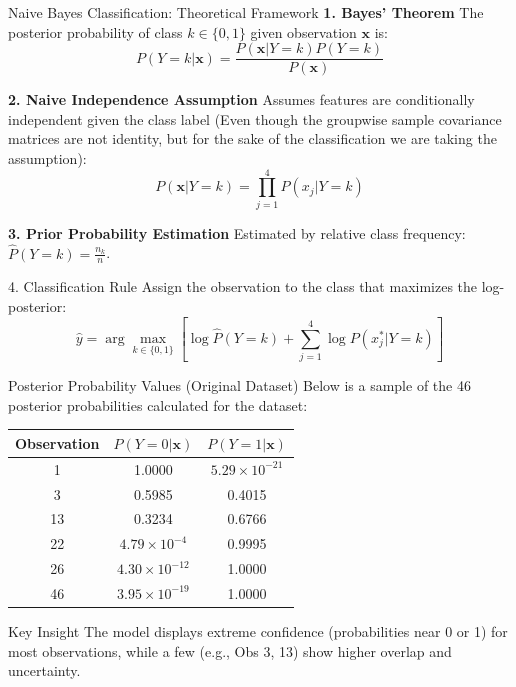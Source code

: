 \documentclass[8pt, aspectratio=169]{beamer}
\begin{document}
\begin{frame}{Naive Bayes Classification: Theoretical Framework}
    \textbf{1. Bayes' Theorem}
    The posterior probability of class $k \in \{0, 1\}$ given observation $\mathbf{x}$ is:
    \[ P(Y = k | \mathbf{x}) = \frac{P(\mathbf{x} | Y = k) P(Y = k)}{P(\mathbf{x})} \]
    
    \textbf{2. Naive Independence Assumption}
    Assumes features are conditionally independent given the class label (Even though the groupwise sample covariance matrices are not identity, but for the sake of the classification we are taking the assumption):
    \[ P(\mathbf{x} | Y = k) = \prod_{j=1}^{4} P(x_j | Y = k) \]
    
    \textbf{3. Prior Probability Estimation}
    Estimated by relative class frequency: $\hat{P}(Y = k) = \frac{n_k}{n}$.

    \vspace{0.3cm}

    \begin{exampleblock}{4. Classification Rule}
        Assign the observation to the class that maximizes the log-posterior:
        \[ \hat{y} = \arg \max_{k \in \{0, 1\}} \left[ \log\hat{P}(Y = k) + \sum_{j=1}^{4} \log P(x_j^* | Y = k) \right] \]
    \end{exampleblock}
\end{frame}

\begin{frame}{Posterior Probability Values (Original Dataset)}
    Below is a sample of the 46 posterior probabilities calculated for the dataset:
    \begin{table}
        \centering
        \small
        \begin{tabular}{ccc}
            \toprule
            Observation & $P(Y=0 | \mathbf{x})$ & $P(Y=1 | \mathbf{x})$ \\
            \midrule
            1 & 1.0000 & $5.29 \times 10^{-21}$ \\
            3 & 0.5985 & 0.4015 \\
            13 & 0.3234 & 0.6766 \\
            22 & $4.79 \times 10^{-4}$ & 0.9995 \\
            26 & $4.30 \times 10^{-12}$ & 1.0000 \\
            46 & $3.95 \times 10^{-19}$ & 1.0000 \\
            \bottomrule
        \end{tabular}
    \end{table}

    \vspace{0.2cm}

    \begin{alertblock}{Key Insight}
        The model displays extreme confidence (probabilities near 0 or 1) for most observations, while a few (e.g., Obs 3, 13) show higher overlap and uncertainty.
    \end{alertblock}
\end{frame}
\end{document}
